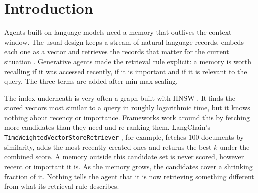 \documentclass[11pt,a4paper]{article}
\newcommand{\code}[1]{\texttt{#1}}
\begin{document}
\section{Introduction}

Agents built on language models need a memory that outlives the context window. The usual design keeps a stream of natural-language records, embeds each one as a vector and retrieves the records that matter for the current situation \citep{lewis2020rag,wang2024survey}. Generative agents \citep{park2023generative} made the retrieval rule explicit: a memory is worth recalling if it was accessed recently, if it is important and if it is relevant to the query. The three terms are added after min-max scaling.

The index underneath is very often a graph built with HNSW \citep{malkov2020hnsw}. It finds the stored vectors most similar to a query in roughly logarithmic time, but it knows nothing about recency or importance. Frameworks work around this by fetching more candidates than they need and re-ranking them. LangChain's \code{TimeWeightedVectorStoreRetriever} \citep{langchain_twr}, for example, fetches 100 documents by similarity, adds the most recently created ones and returns the best $k$ under the combined score. A memory outside this candidate set is never scored, however recent or important it is. As the memory grows, the candidates cover a shrinking fraction of it. Nothing tells the agent that it is now retrieving something different from what its retrieval rule describes.
\end{document}
